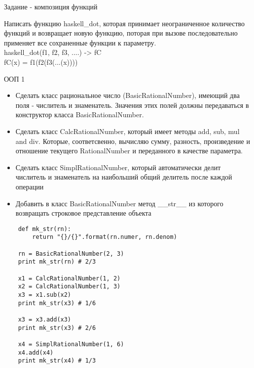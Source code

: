 \documentclass{article}
\begin{document}
\begin{center}Задание - композиция функций\end{center}
    Написать функцию haskell\_dot, которая принимает неограниченное количество функций
    и возвращает новую функцию, поторая при вызове последовательно применяет все 
    сохраненные функции к параметру. \\

    haskell\_dot(f1, f2, f3, ....) -> fC \\
    fC(x) = f1(f2(f3(...(x))))
\newpage

\begin{center} ООП 1 \end{center}
\begin{itemize}
    \item Сделать класс рациональное число (BasicRationalNumber),
        имеющий два поля - числитель и знаменатель. Значения этих полей 
        должны передаваться в конструктор класса BasicRationalNumber.
    \item Сделать класс CalcRationalNumber, который имеет методы add,
        sub, mul and div. Которые, соответсвенно, вычисляю сумму, разность,
        произведение и отношение текущего RationalNumber и переданного в качестве 
        параметра.
    \item Сделать класс SimplRationalNumber, который автоматически делит
        числитель и знаменатель на наибольший общий делитель после каждой операции
    \item Добавить в класс BasicRationalNumber метод \_\_str\_\_ из которого возвращать
        строковое представление объекта
\end{itemize}

\begin{lstlisting}
    def mk_str(rn):
        return "{}/{}".format(rn.numer, rn.denom)

    rn = BasicRationalNumber(2, 3)
    print mk_str(rn) # 2/3

    x1 = CalcRationalNumber(1, 2)
    x2 = CalcRationalNumber(1, 3)
    x3 = x1.sub(x2)
    print mk_str(x3) # 1/6

    x3 = x3.add(x3)
    print mk_str(x3) # 2/6

    x4 = SimplRationalNumber(1, 6)
    x4.add(x4)
    print mk_str(x4) # 1/3
\end{lstlisting}
\newpage
\end{document}
